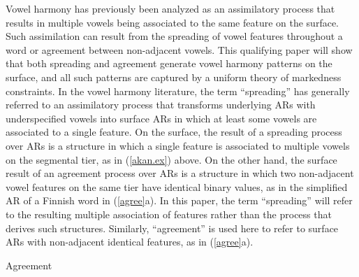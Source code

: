 \documentclass[,doc,floatsintext]{apa6}
\theoremstyle{definition}
\theoremstyle{definition}
\theoremstyle{definition}
\theoremstyle{remark}
\begin{document}
Vowel harmony has previously been analyzed as an assimilatory process
that results in multiple vowels being associated to the same feature on
the surface. Such assimilation can result from the spreading of vowel
features throughout a word or agreement between non-adjacent vowels.
This qualifying paper will show that both spreading and agreement
generate vowel harmony patterns on the surface, and all such patterns
are captured by a uniform theory of markedness constraints. In the vowel
harmony literature, the term \enquote{spreading} has generally referred
to an assimilatory process that transforms underlying ARs with
underspecified vowels into surface ARs in which at least some vowels are
associated to a single feature. On the surface, the result of a
spreading process over ARs is a structure in which a single feature is
associated to multiple vowels on the segmental tier, as in
(\ref{akan.ex}) above. On the other hand, the surface result of an
agreement process over ARs is a structure in which two non-adjacent
vowel features on the same tier have identical binary values, as in the
simplified AR of a Finnish word in (\ref{agree}a). In this paper, the
term \enquote{spreading} will refer to the resulting multiple
association of features rather than the process that derives such
structures. Similarly, \enquote{agreement} is used here to refer to
surface ARs with non-adjacent identical features, as in (\ref{agree}a).

\begin{exe}
\ex Agreement \label{agree} \\
\end{exe}
\end{document}
